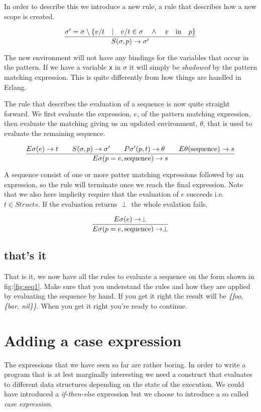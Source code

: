 \documentclass[a4paper,11pt]{article}
\begin{document}
In order to describe this we introduce a new rule, a rule that
describes how a new scope is created.

$$\frac{\sigma' = \sigma \setminus \lbrace v/t \quad | \quad v/t \in \sigma \quad \wedge \quad  v \quad {\rm in} \quad p\rbrace}{S(\sigma, p) \rightarrow \sigma'}$$

The new environment will not have any bindings for the variables that
occur in the pattern. If we have a variable {\tt x} in $\sigma$ it
will simply be {\em shadowed} by the pattern matching expression.
This is quite differently from how things are handled in 
Erlang.

The rule that describes the evaluation of a sequence is now quite
straight forward. We first evaluate the expression, $e$, of the
pattern matching expression, then evaluate the matching giving us an
updated environment, $\theta$, that is used to evaluate the remaining
sequence. 

$$\frac{   
  E\sigma(e) \rightarrow t
  \qquad S(\sigma, p) \rightarrow \sigma'
  \qquad P\sigma'(p, t) \rightarrow \theta
  \qquad E\theta({\rm sequence}) \rightarrow s
}{E\sigma(p = e, {\rm sequence}) \rightarrow s}$$ 

A sequence consist of one or more patter matching expressions followed
by an expression, so the rule will terminate once we reach the final
expression. Note that we also here implicity require that the
evaluation of $e$ succeeds i.e. $t \in Structs$. If the evaluation
returns $\perp$ the whole evalation fails.


$$\frac{   
  E\sigma(e) \rightarrow \perp
}{E\sigma(p = e, {\rm sequence}) \rightarrow \perp}$$ 


\subsection{that's it}

That is it, we now have all the rules to evaluate a sequence on the
form shown in fig:\ref{fig:seq1}. Make sure that you understand
the rules and how they are applied by evaluating the sequence by
hand. If you get it right the result will be {\em \{foo, \{bar,
  nil\}\}}. When you get it right you're ready to continue.


\section{Adding a case expression}

The expressions that we have seen so far are rather boring. In order to
write a program that is at lest marginally interesting we need a
construct that evaluates to different data structures depending on the
state of the execution. We could have introduced a {\em if-then-else}
expression but we choose to introduce a so called {\em case expression}.
\end{document}
